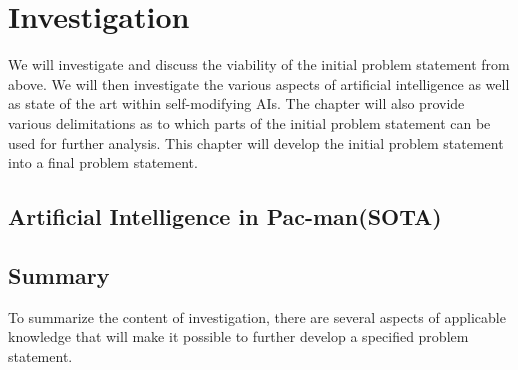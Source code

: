 

\section{Investigation} \label{sec:preanalysis}
We will investigate and discuss the viability of the initial problem statement from above. We will then investigate the various aspects of artificial intelligence as well as state of the art within self-modifying AIs. The chapter will also provide various delimitations as to which parts of the initial problem statement can be used for further analysis. This chapter will develop the initial problem statement into a final problem statement.



\subsection{Artificial Intelligence in Pac-man(SOTA)}

%

\subsection{Summary}
To summarize the content of investigation, there are several aspects of applicable knowledge that will make it possible to further develop a specified problem statement.

